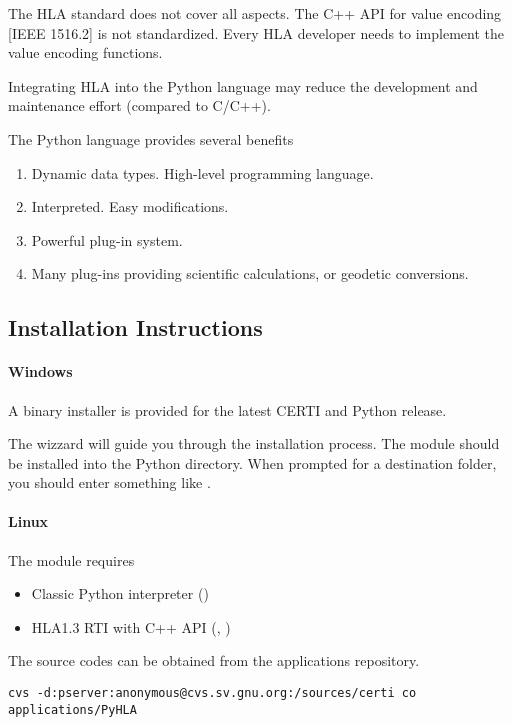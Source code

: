 \documentclass{howto}
\begin{document}
The HLA standard does not cover all aspects.
The C++ API for value encoding [IEEE 1516.2] is not standardized. Every HLA
developer needs to implement the value encoding functions.

Integrating HLA into the Python language may reduce the development and
maintenance effort (compared to C/C++).

The Python language provides several benefits
\begin{enumerate}
\item Dynamic data types. High-level programming language.
\item Interpreted. Easy modifications.
\item Powerful plug-in system.
\item Many plug-ins providing scientific calculations, or geodetic conversions.
\end{enumerate}

\subsection{Installation Instructions}

\paragraph{Windows}

A binary installer is provided for the latest CERTI and Python release.

The wizzard will guide you through the installation process. The 
module should be installed into the Python  directory.
When prompted for a destination folder, you should enter something like
.

\paragraph{Linux}

The  module requires
\begin{itemize}
\item Classic Python interpreter ()
\item HLA1.3 RTI with C++ API (, )
\end{itemize}

The  source codes can be obtained from the 
applications repository.
\begin{verbatim}
cvs -d:pserver:anonymous@cvs.sv.gnu.org:/sources/certi co applications/PyHLA
\end{verbatim}
\end{document}
